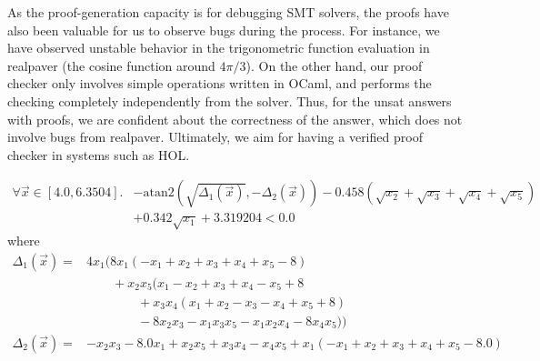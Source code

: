 As the proof-generation capacity is for debugging SMT solvers, the
proofs have also been valuable for us to observe bugs during the
process. For instance, we have observed unstable behavior in the
trigonometric function evaluation in {\sf realpaver} (the cosine
function around $4\pi/3$). On the other hand, our proof checker only
involves simple operations written in {\sf OCaml}, and performs the
checking completely independently from the solver. Thus, for the {\sf
  unsat} answers with proofs, we are confident about the correctness
of the answer, which does not involve bugs from {\sf realpaver}.
Ultimately, we aim for having a verified proof checker in systems such
as HOL.


\begin{align*}
  \forall \vec{x} \in [4.0, 6.3504]. & - \mathrm{atan2}(\sqrt{\Delta_1(\vec{x})}, - \Delta_2(\vec{x})) - 0.458(\sqrt{x_2} + \sqrt{x_3} +\sqrt{x_4} + \sqrt{x_5})\\
  & + 0.342\sqrt{x_1} + 3.319204 < 0.0
\end{align*}
where
\begin{align*}
  \Delta_1(\vec{x}) = & 4x_1 (8x_1 (-x_1 + x_2 + x_3 + x_4 + x_5 - 8)\\
                      & \qquad     + x_2 x_5 (x_1 - x_2 + x_3 + x_4 - x_5 + 8 \\
                      & \qquad \qquad         + x_3x_4(x_1 + x_2 - x_3 - x_4 + x_5 + 8)\\
                      & \qquad \qquad         - 8 x_2 x_3 - x_1 x_3 x_5 - x_1  x_2  x_4 - 8 x_4 x_5))\\
\Delta_2(\vec{x}) = & -x_2 x_3 - 8.0 x_1 + x_2 x_5 + x_3x_4 - x_4 x_5 + x_1 (-x_1 + x_2 + x_3 + x_4 + x_5 - 8.0)
\end{align*}
